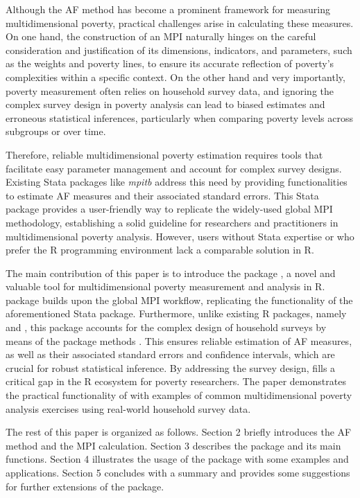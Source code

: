 Although the AF method has become a prominent framework for measuring multidimensional poverty, practical challenges arise in calculating these measures. On one hand, the construction of an MPI naturally hinges on the careful consideration and justification of its dimensions, indicators, and parameters, such as the weights and poverty lines, to ensure its accurate reflection of poverty's complexities within a specific context. On the other hand and very importantly, poverty measurement often relies on household survey data, and ignoring the complex survey design in poverty analysis can lead to biased estimates and erroneous statistical inferences, particularly when comparing poverty levels across subgroups or over time.

Therefore, reliable multidimensional poverty estimation requires tools that facilitate easy parameter management and account for complex survey designs. Existing Stata packages like \emph{mpitb} \citep{mpitb_Stata} address this need by providing functionalities to estimate AF measures and their associated standard errors. This Stata package provides a user-friendly way to replicate the widely-used global MPI methodology, establishing a solid guideline for researchers and practitioners in multidimensional poverty analysis. However, users without Stata expertise or who prefer the R programming environment lack a comparable solution in R.

The main contribution of this paper is to introduce the  package \citep{mpitbRpkg}, a novel and valuable tool for multidimensional poverty measurement and analysis in R.  package builds upon the global MPI workflow, replicating the functionality of the aforementioned Stata package. Furthermore, unlike existing R packages, namely  \citep{MPIpkg} and  \citep{mpindexpkg}, this package accounts for the complex design of household surveys by means of the  package methods \citep{survey_paper, surveybook, surveypkg}. This ensures reliable estimation of AF measures, as well as their associated standard errors and confidence intervals, which are crucial for robust statistical inference. By addressing the survey design,  fills a critical gap in the R ecosystem for poverty researchers. The paper demonstrates the practical functionality of  with examples of common multidimensional poverty analysis exercises using real-world household survey data.

The rest of this paper is organized as follows. Section 2 briefly introduces the AF method and the MPI calculation. Section 3 describes the  package and its main functions. Section 4 illustrates the usage of the package with some examples and applications. Section 5 concludes with a summary and provides some suggestions for further extensions of the package.

